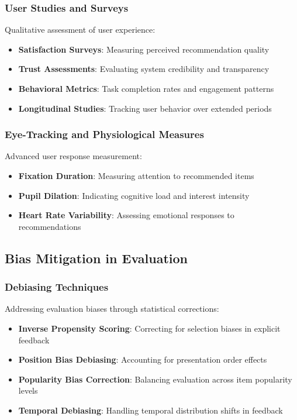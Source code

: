 \documentclass[acmsmall,review,anonymous]{acmart}
\begin{document}
\subsubsection{User Studies and Surveys}

Qualitative assessment of user experience:

\begin{itemize}
    \item \textbf{Satisfaction Surveys}: Measuring perceived recommendation quality
    \item \textbf{Trust Assessments}: Evaluating system credibility and transparency
    \item \textbf{Behavioral Metrics}: Task completion rates and engagement patterns
    \item \textbf{Longitudinal Studies}: Tracking user behavior over extended periods
\end{itemize}

\subsubsection{Eye-Tracking and Physiological Measures}

Advanced user response measurement:

\begin{itemize}
    \item \textbf{Fixation Duration}: Measuring attention to recommended items
    \item \textbf{Pupil Dilation}: Indicating cognitive load and interest intensity
    \item \textbf{Heart Rate Variability}: Assessing emotional responses to recommendations
\end{itemize}

\subsection{Bias Mitigation in Evaluation}

\subsubsection{Debiasing Techniques}

Addressing evaluation biases through statistical corrections:

\begin{itemize}
    \item \textbf{Inverse Propensity Scoring}: Correcting for selection biases in explicit feedback
    \item \textbf{Position Bias Debiasing}: Accounting for presentation order effects
    \item \textbf{Popularity Bias Correction}: Balancing evaluation across item popularity levels
    \item \textbf{Temporal Debiasing}: Handling temporal distribution shifts in feedback
\end{itemize}
\end{document}
